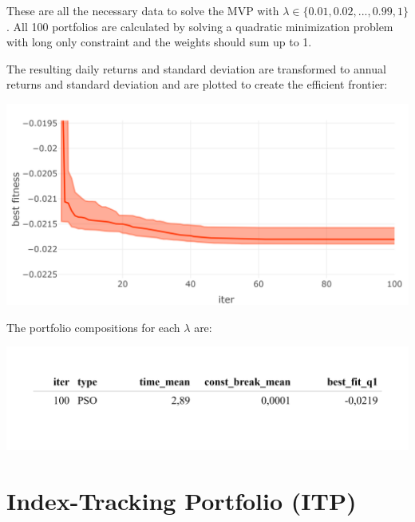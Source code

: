 \documentclass[
  oneside]{book}
\begin{document}
These are all the necessary data to solve the MVP with \(\lambda \in \{0.01, 0.02, ..., 0.99, 1\}\). All 100 portfolios are calculated by solving a quadratic minimization problem with long only constraint and the weights should sum up to 1.

The resulting daily returns and standard deviation are transformed to annual returns and standard deviation and are plotted to create the efficient frontier:

\includegraphics{Master_Thesis_files/figure-latex/unnamed-chunk-8-1.png}

The portfolio compositions for each \(\lambda\) are:

\includegraphics{Master_Thesis_files/figure-latex/unnamed-chunk-9-1.png}

\hypertarget{index-tracking-portfolio-itp}{%
\section{Index-Tracking Portfolio (ITP)}\label{index-tracking-portfolio-itp}}
\end{document}

